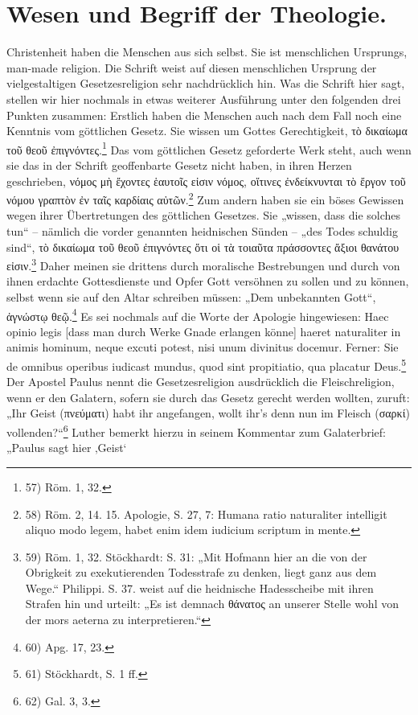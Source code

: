 \section*{Wesen und Begriff der Theologie.}
Christenheit haben die Menschen aus sich selbst. Sie ist menschlichen Ursprungs, man-made religion. Die Schrift weist auf diesen menschlichen Ursprung der vielgestaltigen Gesetzesreligion sehr nachdrücklich hin. Was die Schrift hier sagt, stellen wir hier nochmals in etwas weiterer Ausführung unter den folgenden drei Punkten zusammen: Erstlich haben die Menschen auch nach dem Fall noch eine Kenntnis vom göttlichen Gesetz. Sie wissen um Gottes Gerechtigkeit, \textgreek{τὸ δικαίωμα τοῦ θεοῦ ἐπιγνόντες.}\footnote{57) Röm. 1, 32.} Das vom göttlichen Gesetz geforderte Werk steht, auch wenn sie das in der Schrift geoffenbarte Gesetz nicht haben, in ihren Herzen geschrieben, \textgreek{νόμος μὴ ἔχοντες ἑαυτοῖς εἰσιν νόμος, οἵτινες ἐνδείκνυνται τὸ ἔργον τοῦ νόμου γραπτὸν ἐν ταῖς καρδίαις αὐτῶν.}\footnote{58) Röm. 2, 14. 15. Apologie, S. 27, 7: Humana ratio naturaliter intelligit aliquo modo legem, habet enim idem iudicium scriptum in mente.} Zum andern haben sie ein böses Gewissen wegen ihrer Übertretungen des göttlichen Gesetzes. Sie „wissen, dass die solches tun“ -- nämlich die vorder genannten heidnischen Sünden -- „des Todes schuldig sind“, \textgreek{τὸ δικαίωμα τοῦ θεοῦ ἐπιγνόντες ὅτι οἱ τὰ τοιαῦτα πράσσοντες ἄξιοι θανάτου εἰσιν.}\footnote{59) Röm. 1, 32. Stöckhardt: S. 31: „Mit Hofmann hier an die von der Obrigkeit zu exekutierenden Todesstrafe zu denken, liegt ganz aus dem Wege.“ Philippi. S. 37. weist auf die heidnische Hadesscheibe mit ihren Strafen hin und urteilt: „Es ist demnach \textgreek{θάνατος} an unserer Stelle wohl von der mors aeterna zu interpretieren.“} Daher meinen sie drittens durch moralische Bestrebungen und durch von ihnen erdachte Gottesdienste und Opfer Gott versöhnen zu sollen und zu können, selbst wenn sie auf den Altar schreiben müssen: „Dem unbekannten Gott“, \textgreek{ἀγνώστῳ θεῷ.}\footnote{60) Apg. 17, 23.} Es sei nochmals auf die Worte der Apologie hingewiesen: Haec opinio legis [dass man durch Werke Gnade erlangen könne] haeret naturaliter in animis hominum, neque excuti potest, nisi unum divinitus docemur. Ferner: Sie de omnibus operibus iudicast mundus, quod sint propitiatio, qua placatur Deus.\footnote{61) Stöckhardt, S. 1 ff.} Der Apostel Paulus nennt die Gesetzesreligion ausdrücklich die Fleischreligion, wenn er den Galatern, sofern sie durch das Gesetz gerecht werden wollten, zuruft: „Ihr Geist (\textgreek{πνεύματι}) habt ihr angefangen, wollt ihr's denn nun im Fleisch (\textgreek{σαρκί}) vollenden?“\footnote{62) Gal. 3, 3.} Luther bemerkt hierzu in seinem Kommentar zum Galaterbrief: „Paulus sagt hier ‚Geist‘